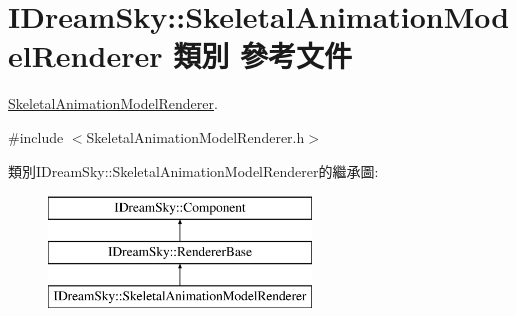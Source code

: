 \hypertarget{class_i_dream_sky_1_1_skeletal_animation_model_renderer}{}\section{I\+Dream\+Sky\+:\+:Skeletal\+Animation\+Model\+Renderer 類別 參考文件}
\label{class_i_dream_sky_1_1_skeletal_animation_model_renderer}


\hyperlink{class_i_dream_sky_1_1_skeletal_animation_model_renderer}{Skeletal\+Animation\+Model\+Renderer}.  




{\ttfamily \#include $<$Skeletal\+Animation\+Model\+Renderer.\+h$>$}

類別\+I\+Dream\+Sky\+:\+:Skeletal\+Animation\+Model\+Renderer的繼承圖\+:\begin{figure}[H]
\begin{center}
\leavevmode
\includegraphics[height=3.000000cm]{class_i_dream_sky_1_1_skeletal_animation_model_renderer}
\end{center}
\end{figure}
